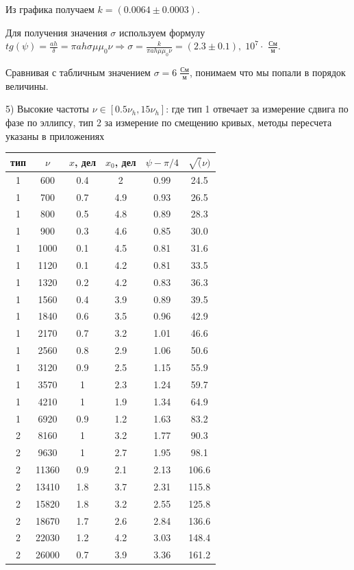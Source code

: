 \documentclass[a4paper,12pt]{extarticle}
\begin{document}
Из графика получаем $k = (0.0064\pm0.0003)$.

Для получения значения $\sigma$ используем формулу $tg(\psi) = \frac{ah}{\delta} = \pi a h \sigma \mu \mu_0 \nu \Rightarrow \sigma = \frac{k}{ \pi a h \mu \mu_0 \nu} = (2.3\pm0.1),\; 10^7 \cdot$ $\frac{\text{См}}{\text{м}}$.

Сравнивая с табличным значением $\sigma = 6\; \frac{\text{См}}{\text{м}}$, понимаем что мы попали в порядок величины.

5) Высокие частоты $\nu \in [0.5\nu_h, 15\nu_h]$: где тип 1 отвечает за измерение сдвига по фазе по эллипсу, тип 2 за измерение по смещению кривых, методы пересчета указаны в приложениях\\
\begin{tabular}{|c|c|c|c|c|c|}
\hline
тип & $\nu$    & $x$, дел & $x_0$, дел & $\psi - \pi/4$ & $\sqrt(\nu)$ \\ \hline
1   & 600   & 0.4 & 2    & 0.99       & 24.5     \\ \hline
1   & 700   & 0.7 & 4.9  & 0.93       & 26.5     \\ \hline
1   & 800   & 0.5 & 4.8  & 0.89       & 28.3     \\ \hline
1   & 900   & 0.3 & 4.6  & 0.85       & 30.0     \\ \hline
1   & 1000  & 0.1 & 4.5  & 0.81       & 31.6     \\ \hline
1   & 1120  & 0.1 & 4.2  & 0.81       & 33.5     \\ \hline
1   & 1320  & 0.2 & 4.2  & 0.83       & 36.3     \\ \hline
1   & 1560  & 0.4 & 3.9  & 0.89       & 39.5     \\ \hline
1   & 1840  & 0.6 & 3.5  & 0.96       & 42.9     \\ \hline
1   & 2170  & 0.7 & 3.2  & 1.01       & 46.6     \\ \hline
1   & 2560  & 0.8 & 2.9  & 1.06       & 50.6     \\ \hline
1   & 3120  & 0.9 & 2.5  & 1.15       & 55.9     \\ \hline
1   & 3570  & 1   & 2.3  & 1.24       & 59.7     \\ \hline
1   & 4210  & 1   & 1.9  & 1.34       & 64.9     \\ \hline
1   & 6920  & 0.9 & 1.2  & 1.63       & 83.2     \\ \hline
2   & 8160  & 1   & 3.2  & 1.77       & 90.3     \\ \hline
2   & 9630  & 1   & 2.7  & 1.95       & 98.1     \\ \hline
2   & 11360 & 0.9 & 2.1  & 2.13       & 106.6    \\ \hline
2   & 13410 & 1.8 & 3.7  & 2.31       & 115.8    \\ \hline
2   & 15820 & 1.8 & 3.2  & 2.55       & 125.8    \\ \hline
2   & 18670 & 1.7 & 2.6  & 2.84       & 136.6    \\ \hline
2   & 22030 & 1.2 & 4.2  & 3.03       & 148.4    \\ \hline
2   & 26000 & 0.7 & 3.9  & 3.36       & 161.2    \\ \hline
\end{tabular}\\
\end{document}
